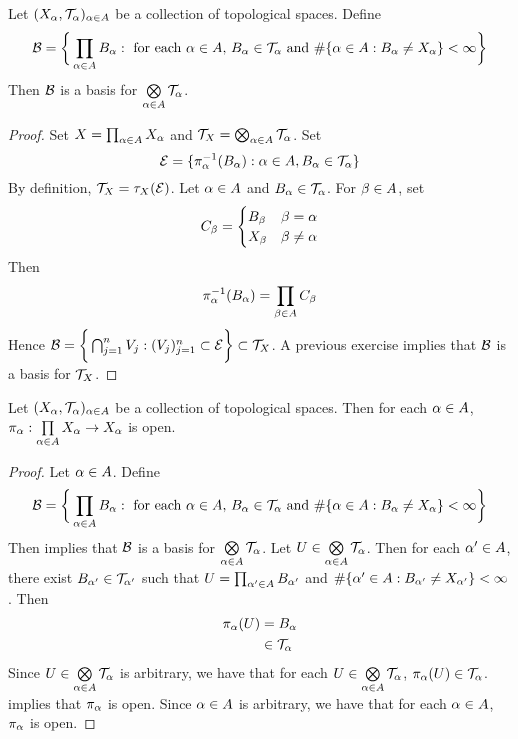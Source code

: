 \documentclass{book}
\begin{document}
	\begin{ex} 
		Let $(X_{\alpha}, \mathcal{T}_{\alpha})_{\alpha \in A}$ be a collection of topological spaces. Define 
		$$\mathcal{B} = \bigg \{\prod_{\alpha \in A}B_{\alpha}: \text{ for each $\alpha \in A$,  $B_{\alpha} \in \mathcal{T}_{\alpha}$ and $\# \{\alpha \in A: B_{\alpha} \neq X_{\alpha}\} < \infty$} \bigg\}$$
		Then $\mathcal{B}$ is a basis for $\bigotimes\limits_{\alpha \in A} \mathcal{T}_{\alpha}$.
	\end{ex}

	\begin{proof}
		Set $X = \prod_{\alpha \in A}X_{\alpha}$ and $\mathcal{T}_X = \bigotimes_{\alpha \in A} \mathcal{T}_{\alpha}$. Set 
		$$\mathcal{E} = \{\pi_{\alpha}^{-1}(B_{\alpha}): \alpha \in A, B_{\alpha} \in \mathcal{T}_{\alpha}\}$$ 
		By definition, $\mathcal{T}_{X} = \tau_{X}(\mathcal{E})$. Let $\alpha \in A$ and $B_{\alpha} \in \mathcal{T}_{\alpha}$. For $\beta \in A$, set 
		\[
		C_{\beta} = 
		\begin{cases}
			B_{\beta} & \beta = \alpha \\
			X_{\beta} & \beta \neq \alpha
		\end{cases}
		\]
		Then 
		\begin{align*}
			\pi_{\alpha}^{-1}(B_{\alpha}) = \prod_{\beta \in A} C_{\beta}  
		\end{align*}
		Hence $\mathcal{B} = \bigg \{\bigcap_{j=1}^n V_j:(V_j)_{j=1}^n \subset \mathcal{E} \bigg \} \subset \mathcal{T}_X$. A previous exercise implies that $\mathcal{B}$ is a basis for $\mathcal{T}_X$.
	\end{proof}

	\begin{ex} 
		Let $(X_{\alpha}, \mathcal{T}_{\alpha})_{\alpha \in A}$ be a collection of topological spaces. Then for each $\alpha \in A$, $\pi_{\alpha}: \prod\limits_{\alpha \in A} X_{\alpha} \rightarrow X_{\alpha}$ is open.
	\end{ex}

	\begin{proof}
		Let $\alpha \in A$. Define 
		$$\mathcal{B} = \bigg \{\prod_{\alpha \in A}B_{\alpha}: \text{ for each $\alpha \in A$,  $B_{\alpha} \in \mathcal{T}_{\alpha}$ and $\# \{\alpha \in A: B_{\alpha} \neq X_{\alpha}\} < \infty$} \bigg\}$$
		Then  implies that $\mathcal{B}$ is a basis for $\bigotimes\limits_{\alpha \in A} \mathcal{T}_{\alpha}$. Let $U \in \bigotimes\limits_{\alpha \in A} \mathcal{T}_{\alpha}$. Then for each $\alpha' \in A$, there exist $B_{\alpha'} \in \mathcal{T}_{\alpha'}$ such that $U = \prod_{\alpha' \in A}B_{\alpha'}$ and $\# \{\alpha' \in A: B_{\alpha'} \neq X_{\alpha'}\} < \infty$. Then 
		\begin{align*}
			\pi_{\alpha}(U)
			& = B_{\alpha} \\
			& \in \mathcal{T}_{\alpha}
		\end{align*}
		Since $U \in  \bigotimes\limits_{\alpha \in A} \mathcal{T}_{\alpha}$ is arbitrary, we have that for each $U \in  \bigotimes\limits_{\alpha \in A} \mathcal{T}_{\alpha}$, $\pi_{\alpha}(U) \in \mathcal{T}_{\alpha}$.  implies that $\pi_{\alpha}$ is open. Since $\alpha \in A$ is arbitrary, we have that for each $\alpha \in A$, $\pi_{\alpha}$ is open.
	\end{proof}
\end{document}
